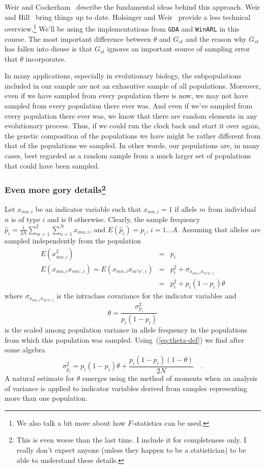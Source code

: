 Weir and Cockerham~\cite{WeirCockerham84} describe the fundamental
ideas behind this approach. Weir and Hill~\cite{Weir-Hill-2002} bring
things up to date. Holsinger and Weir~\cite{Holsinger-Weir-2009}
provide a less technical overview.\footnote{We also talk a bit more
  about how $F$-statistics can be used.} We'll be using the
implementations from {\tt GDA} and {\tt WinARL} in this course. The
most important difference between $\theta$ and $G_{st}$ and the reason
why $G_{st}$ has fallen into disuse is that $G_{st}$ ignores an
important source of sampling error that $\theta$ incorporates.

In many applications, especially in evolutionary biology, the
subpopulations included in our sample are not an exhasutive sample of
all populations. Moreover, even if we have sampled from every
population there is now, we may not have sampled from every population
there ever was. And even if we've sampled from every population there
ever was, we know that there are random elements in any evolutionary
process. Thus, if we could run the clock back and start it over again,
the genetic composition of the populations we have might be rather
different from that of the populations we sampled. In other words, our
populations are, in many cases, best regarded as a random sample from
a much larger set of populations that could have been
sampled.

\subsubsection*{Even more gory details\footnote{This is even worse
    than the last time. I include it for completeness only. I really
    don't expect anyone (unless they happen to be a statistician) to
    be able to understand these details.}}

Let $x_{mn,i}$ be an indicator variable such that $x_{mn,i} = 1$ if
allele $m$ from individual $n$ is of type $i$ and is 0
otherwise. Clearly, the sample frequency $\hat p_i =
\frac{1}{2N}\sum_{m=1}^2\sum_{n=1}^Nx_{mn,i}$, and $E(\hat p_i) =
p_i$, $i=1\dots A$. Assuming that alleles are sampled independently
from the population
\begin{eqnarray*}
E(x^2_{mn,i}) &=& p_i \\
E(x_{mn,i}x_{mn',i}) = E(x_{mn,i}x_{m'n',i}) &=& p_i^2 + \sigma_{x_{mn,i}x_{m'n',i}} \\
&=& p_i^2 + p_i(1-p_i)\theta
\end{eqnarray*}
where $\sigma_{x_{mn,i}x_{m'n',i}}$ is the intraclass covariance for
the indicator variables and 
\begin{equation}
\theta = \frac{\sigma^2_{p_i}}{p_i(1-p_i)} \label{eq:theta-def}
\end{equation}
is the scaled among population variance in allele frequency in the
populations from which this population was
sampled. Using~(\ref{eq:theta-def}) we find after some algebra
\[
\sigma^2_{\hat p_i} = p_i(1-p_i)\theta +
\frac{p_i(1-p_i)(1-\theta)}{2N} \quad .
\]
A natural estimate for $\theta$ emerges using the method of moments
when an analysis of variance is applied to indicator variables derived
from samples representing more than one
population.

